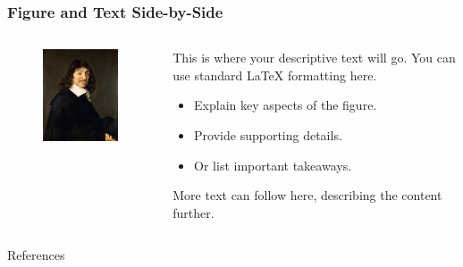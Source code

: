 \documentclass[12pt]{beamer} %
\begin{document}
	\begin{frame}
		\frametitle{Figure and Text Side-by-Side} %
		
		\begin{columns}[T] %
			
			\begin{column}{0.50\textwidth} %
				\centering %
				\begin{figure}
				    \includegraphics[width=0.8\linewidth]{dikaer.jpg}
				\end{figure}
			\end{column}
			
			\begin{column}{0.50\textwidth} %
				This is where your descriptive text will go.
				You can use standard LaTeX formatting here.
				\begin{itemize}
					\item Explain key aspects of the figure.
					\item Provide supporting details.
					\item Or list important takeaways.
				\end{itemize}
				More text can follow here, describing the content further.
			\end{column}
			
		\end{columns}
	\end{frame}

    \begin{frame}[allowframebreaks]{References}
    	
    	
    \end{frame}
	
\end{document}
